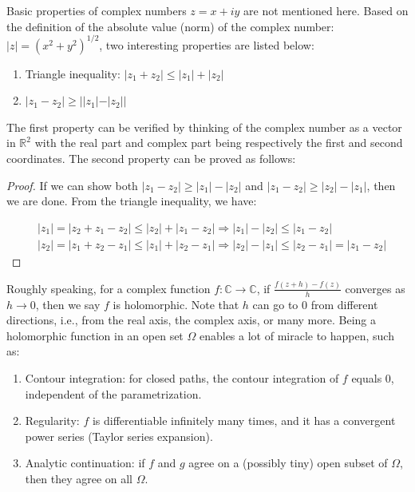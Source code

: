\documentclass{article}
\begin{document}
Basic properties of complex numbers $z=x+iy$ are not mentioned here. Based on the definition of the absolute value (norm) of the complex number: $|z|=(x^2+y^2)^{1/2}$, two interesting properties are listed below:

\begin{enumerate}
\item
Triangle inequality: $|z_1+z_2|\leq|z_1|+|z_2|$

\item
$|z_1-z_2|\geq||z_1|-|z_2||$
\end{enumerate}
The first property can be verified by thinking of the complex number as a vector in $\mathbb{R}^2$ with the real part and complex part being respectively the first and second coordinates. The second property can be proved as follows:

\begin{proof}
If we can show both $|z_1-z_2|\geq|z_1|-|z_2|$ and $|z_1-z_2|\geq|z_2|-|z_1|$, then we are done. From the triangle inequality, we have:

\begin{equation*}
\begin{aligned}
&|z_1|=|z_2+z_1-z_2|\leq|z_2|+|z_1-z_2|\Rightarrow |z_1|-|z_2|\leq|z_1-z_2|\\
&|z_2|=|z_1+z_2-z_1|\leq|z_1|+|z_2-z_1|\Rightarrow |z_2|-|z_1|\leq|z_2-z_1|=|z_1-z_2|
\end{aligned}
\end{equation*}
\end{proof}

Roughly speaking, for a complex function $f:\mathbb{C}\rightarrow\mathbb{C}$, if $\frac{f(z+h)-f(z)}{h}$ converges as $h\rightarrow0$, then we say $f$ is holomorphic. Note that $h$ can go to $0$ from different directions, i.e., from the real axis, the complex axis, or many more. Being a holomorphic function in an open set $\Omega$ enables a lot of miracle to happen, such as:

\begin{enumerate}
\item
Contour integration: for closed paths, the contour integration of $f$ equals 0, independent of the parametrization.

\item
Regularity: $f$ is differentiable infinitely many times, and it has a convergent power series (Taylor series expansion).

\item
Analytic continuation: if $f$ and $g$ agree on a (possibly tiny) open subset of $\Omega$, then they agree on all $\Omega$.
\end{enumerate}
\end{document}
